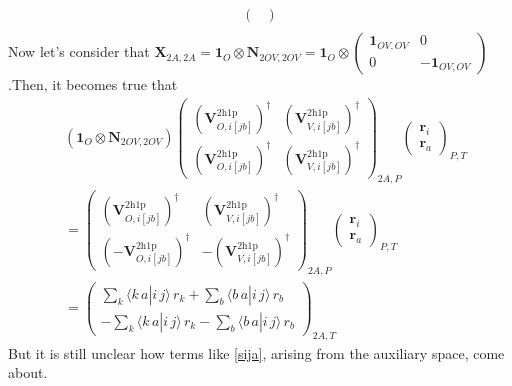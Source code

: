 \begin{align}
\begin{pmatrix}
\end{pmatrix} \\
\end{align}
Now let's consider that $\bm{X}_{2A,2A} = \bm{1}_O \otimes \bm{N}_{2OV,2OV} =\bm{1}_O \otimes \begin{pmatrix}
\bm{1}_{OV,OV} & 0 \\
0 & -\bm{1}_{OV,OV}
\end{pmatrix}
$.Then, it becomes true that
\begin{align}
&\left( \bm{1}_O \otimes \bm{N}_{2OV,2OV} \right) \begin{pmatrix}\left(\bm{V}^{2 \mathrm{h1p}}_{O,i[jb]}\right)^\dag & \left(\bm{V}^{2 \mathrm{h1p}}_{V,i[{jb}]}\right)^\dag \\ \left(\bm{V}^{2 \mathrm{h1p}}_{O,i[jb]}\right)^\dag & \left(\bm{V}^{2 \mathrm{h1p}}_{V,i[{jb}]}\right)^\dag\end{pmatrix}_{2A,P} \begin{pmatrix}
\bm{r}_i \\ \bm{r}_a
\end{pmatrix}_{P,T}\\
 &= \begin{pmatrix}\left(\bm{V}^{2 \mathrm{h1p}}_{O,i[jb]}\right)^\dag & \left(\bm{V}^{2 \mathrm{h1p}}_{V,i[{jb}]}\right)^\dag \\ \left(-\bm{V}^{2 \mathrm{h1p}}_{O,i[jb]}\right)^\dag & -\left(\bm{V}^{2 \mathrm{h1p}}_{V,i[{jb}]}\right)^\dag\end{pmatrix}_{2A,P} \begin{pmatrix}
\bm{r}_i \\ \bm{r}_a
\end{pmatrix}_{P,T} \\
&= \begin{pmatrix}
\sum_{k} \bigl\langle k\,a | i\,j \bigr\rangle\,r_k + \sum_{b} \bigl\langle b\,a | i\,j \bigr\rangle\,r_b \\
-\sum_{k} \bigl\langle k\,a | i\,j \bigr\rangle\,r_k - \sum_{b} \bigl\langle b\,a | i\,j \bigr\rangle\,r_b
\end{pmatrix}_{2A,T}
\end{align}
But it is still unclear how terms like \ref{sija}, arising from the auxiliary space, come about.
